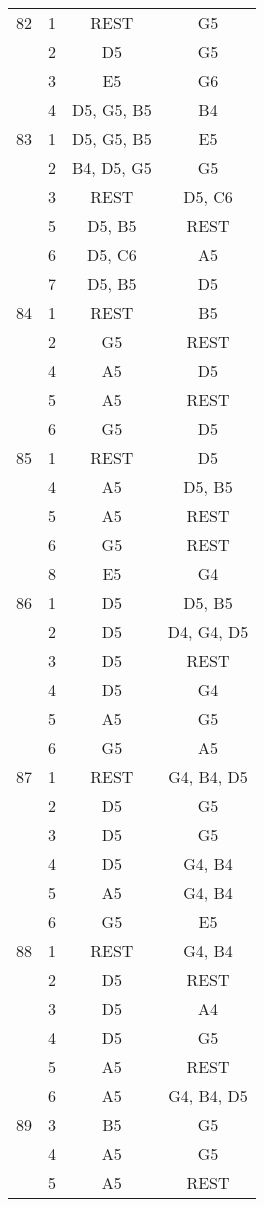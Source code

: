 \documentclass{article}
\begin{document}
\begin{longtable}{|c|c|c|c|}
\hline
82 & 1 & REST & G5 \\ 
  & 2 & D5 & G5 \\ 
  & 3 & E5 & G6 \\ 
  & 4 & D5, G5, B5 & B4 \\ 
\hline
83 & 1 & D5, G5, B5 & E5 \\ 
  & 2 & B4, D5, G5 & G5 \\ 
  & 3 & REST & D5, C6 \\ 
  & 5 & D5, B5 & REST \\ 
  & 6 & D5, C6 & A5 \\ 
  & 7 & D5, B5 & D5 \\ 
\hline
84 & 1 & REST & B5 \\ 
  & 2 & G5 & REST \\ 
  & 4 & A5 & D5 \\ 
  & 5 & A5 & REST \\ 
  & 6 & G5 & D5 \\ 
\hline
85 & 1 & REST & D5 \\ 
  & 4 & A5 & D5, B5 \\ 
  & 5 & A5 & REST \\ 
  & 6 & G5 & REST \\ 
  & 8 & E5 & G4 \\ 
\hline
86 & 1 & D5 & D5, B5 \\ 
  & 2 & D5 & D4, G4, D5 \\ 
  & 3 & D5 & REST \\ 
  & 4 & D5 & G4 \\ 
  & 5 & A5 & G5 \\ 
  & 6 & G5 & A5 \\ 
\hline
87 & 1 & REST & G4, B4, D5 \\ 
  & 2 & D5 & G5 \\ 
  & 3 & D5 & G5 \\ 
  & 4 & D5 & G4, B4 \\ 
  & 5 & A5 & G4, B4 \\ 
  & 6 & G5 & E5 \\ 
\hline
88 & 1 & REST & G4, B4 \\ 
  & 2 & D5 & REST \\ 
  & 3 & D5 & A4 \\ 
  & 4 & D5 & G5 \\ 
  & 5 & A5 & REST \\ 
  & 6 & A5 & G4, B4, D5 \\ 
\hline
89 & 3 & B5 & G5 \\ 
  & 4 & A5 & G5 \\ 
  & 5 & A5 & REST \\ 

\end{longtable}
\end{document}
